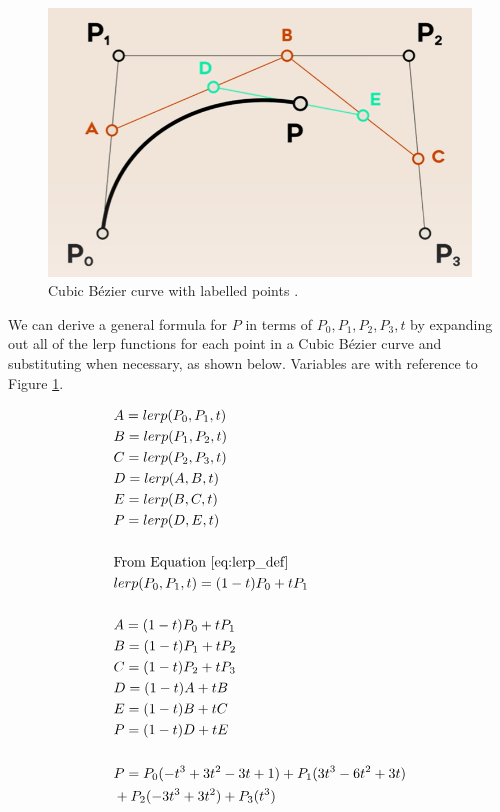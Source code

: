 \documentclass[letterpaper, 12pt]{article}
\begin{document}
\begin{figure}[H]
    \centering
    \includegraphics[width=.6\textwidth]{labelled_cubic.png}
    \caption{Cubic Bézier curve with labelled points \protect\cite{holmerBeautyBezierCurves2021}.}
    \label{fig:labelled_cubic}
\end{figure}

We can derive a general formula for \(P\) in terms of \(P_0, P_1, P_2, P_3, t\) by expanding out
all of the lerp functions for each point in a Cubic Bézier curve
and substituting when necessary, as shown below. Variables are
with reference to Figure \ref*{fig:labelled_cubic}.

\begingroup
\allowdisplaybreaks
\begin{align*}
     & A = lerp(P_0, P_1, t)
    \\
     & B = lerp(P_1, P_2, t)
    \\
     & C = lerp(P_2, P_3, t)
    \\
     & D = lerp(A, B, t)
    \\
     & E = lerp(B, C, t)
    \\
     & P = lerp(D, E, t)
    \\
    \\
     & \text{From Equation } \protect\ref*{eq:lerp_def}
    \\
     & lerp(P_0, P_1, t) = (1-t)P_0 + tP_1
    \\
    \\
     & A = (1-t)P_0 + tP_1
    \\
     & B = (1-t)P_1 + tP_2
    \\
     & C = (1-t)P_2 + tP_3
    \\
     & D = (1-t)A + tB
    \\
     & E = (1-t)B + tC
    \\
     & P = (1-t)D + tE
    \\
    \\
     & P = P_0(-t^3+3t^2-3t+1) + P_1(3t^3-6t^2+3t)
    \\
     & + P_2(-3t^3+3t^2) + P_3(t^3)
\end{align*}
\endgroup
\end{document}
